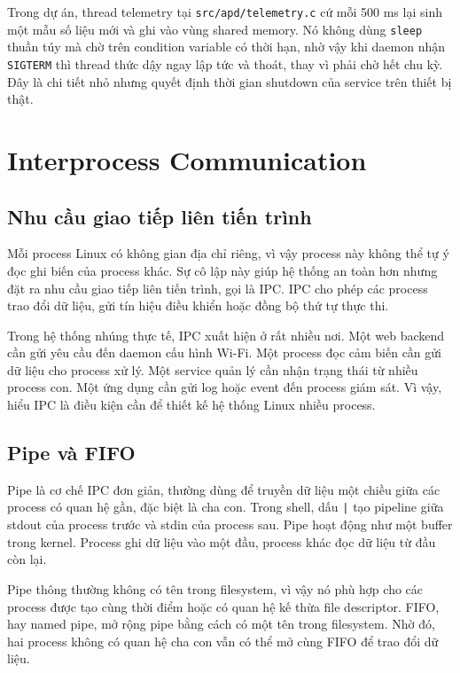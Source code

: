 \documentclass[11pt]{article}
\newcommand{\code}[1]{\texttt{#1}}
\begin{document}
Trong dự án, thread telemetry tại \code{src/apd/telemetry.c} cứ mỗi 500 ms lại sinh một mẫu số liệu mới và ghi vào vùng shared memory. Nó không dùng \code{sleep} thuần túy mà chờ trên condition variable có thời hạn, nhờ vậy khi daemon nhận \code{SIGTERM} thì thread thức dậy ngay lập tức và thoát, thay vì phải chờ hết chu kỳ. Đây là chi tiết nhỏ nhưng quyết định thời gian shutdown của service trên thiết bị thật.

\section{Interprocess Communication}

\subsection{Nhu cầu giao tiếp liên tiến trình}

Mỗi process Linux có không gian địa chỉ riêng, vì vậy process này không thể tự ý đọc ghi biến của process khác. Sự cô lập này giúp hệ thống an toàn hơn nhưng đặt ra nhu cầu giao tiếp liên tiến trình, gọi là IPC. IPC cho phép các process trao đổi dữ liệu, gửi tín hiệu điều khiển hoặc đồng bộ thứ tự thực thi.

Trong hệ thống nhúng thực tế, IPC xuất hiện ở rất nhiều nơi. Một web backend cần gửi yêu cầu đến daemon cấu hình Wi-Fi. Một process đọc cảm biến cần gửi dữ liệu cho process xử lý. Một service quản lý cần nhận trạng thái từ nhiều process con. Một ứng dụng cần gửi log hoặc event đến process giám sát. Vì vậy, hiểu IPC là điều kiện cần để thiết kế hệ thống Linux nhiều process.

\subsection{Pipe và FIFO}

Pipe là cơ chế IPC đơn giản, thường dùng để truyền dữ liệu một chiều giữa các process có quan hệ gần, đặc biệt là cha con. Trong shell, dấu \code{|} tạo pipeline giữa stdout của process trước và stdin của process sau. Pipe hoạt động như một buffer trong kernel. Process ghi dữ liệu vào một đầu, process khác đọc dữ liệu từ đầu còn lại.

Pipe thông thường không có tên trong filesystem, vì vậy nó phù hợp cho các process được tạo cùng thời điểm hoặc có quan hệ kế thừa file descriptor. FIFO, hay named pipe, mở rộng pipe bằng cách có một tên trong filesystem. Nhờ đó, hai process không có quan hệ cha con vẫn có thể mở cùng FIFO để trao đổi dữ liệu.
\end{document}
